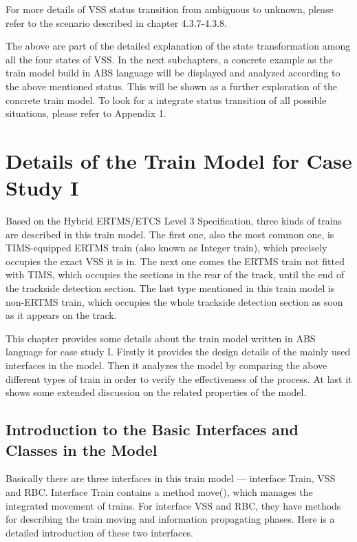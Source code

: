 \documentclass[article,dr=phil,type=msc,colorback,accentcolor=tud9c]{tudthesis}
\begin{document}
  For more details of VSS status transition from ambiguous to unknown, please refer to the scenario described in chapter 4.3.7-4.3.8.  	

  The above are part of the detailed explanation of the state transformation among all the four states of VSS. In the next subchapters, a concrete example as the train model build in ABS language will be displayed and analyzed according to the above mentioned status. This will be shown as a further exploration of the concrete train model. To look for a integrate status transition of all possible situations, please refer to Appendix 1.
  

  \section{Details of the Train Model for Case Study I}
  
  Based on the Hybrid ERTMS/ETCS Level 3 Specification, three kinds of trains are described in this train model. The first one, also the most common one, is TIMS-equipped ERTMS train (also known as Integer train), which precisely occupies the exact VSS it is in. The next one comes the ERTMS train not fitted with TIMS, which occupies the sections in the rear of the track, until the end of the trackside detection section. The last type mentioned in this train model is non-ERTMS train, which occupies the whole trackside detection section as soon as it appears on the track.
  
  This chapter provides some details about the train model written in ABS language for case study I. Firstly it provides the design details of the mainly used interfaces in the model. Then it analyzes the model by comparing the above different types of train in order to verify the effectiveness of the process. At last it shows some extended discussion on the related properties of the model.
  
  \subsection{Introduction to the Basic Interfaces and Classes in the Model}
  
  Basically there are three interfaces in this train model --- interface Train, VSS and RBC. Interface Train contains a method move(), which manages the integrated movement of trains. For interface VSS and RBC, they have methods for describing the train moving and information propagating phases. Here is a detailed introduction of these two interfaces.
  
\end{document}
